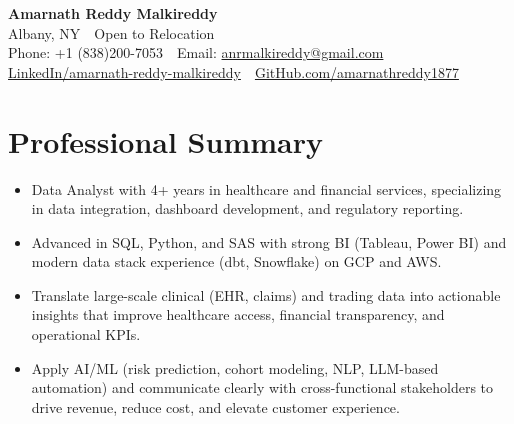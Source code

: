 \documentclass[9.5pt]{article}
\begin{document}
\begin{center}
{\LARGE\textbf{Amarnath Reddy Malkireddy}}\\
Albany, NY \,\textbar\, Open to Relocation \\
Phone: +1 (838)200-7053 \,\textbar\, Email: \href{mailto:anrmalkireddy@gmail.com}{anrmalkireddy@gmail.com}\\
\href{https://www.linkedin.com/in/amarnath-reddy-malkireddy}{LinkedIn/amarnath-reddy-malkireddy} \,\textbar\,
\href{https://github.com/amarnathreddy1877}{GitHub.com/amarnathreddy1877}
\end{center}
\vspace{0.5em}

\section*{Professional Summary}
\begin{itemize}[leftmargin=*]
  \item Data Analyst with 4+ years in healthcare and financial services, specializing in data integration, dashboard development, and regulatory reporting.
  \item Advanced in SQL, Python, and SAS with strong BI (Tableau, Power BI) and modern data stack experience (dbt, Snowflake) on GCP and AWS.
  \item Translate large-scale clinical (EHR, claims) and trading data into actionable insights that improve healthcare access, financial transparency, and operational KPIs.
  \item Apply AI/ML (risk prediction, cohort modeling, NLP, LLM-based automation) and communicate clearly with cross-functional stakeholders to drive revenue, reduce cost, and elevate customer experience.
\end{itemize}

\end{document}
